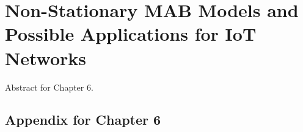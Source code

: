 

\chapter{Non-Stationary MAB Models and Possible Applications for IoT Networks}
\label{chapter:6}
\minitoc

Abstract for Chapter 6.

\newpage
\graphicspath{{2-Chapters/6-Chapter/Images/}}











\section{Appendix for Chapter 6}
\label{sec:6:appendix}


